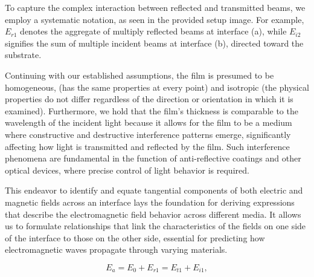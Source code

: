 To capture the complex interaction between reflected and transmitted beams, we employ a systematic notation, as seen in the provided setup image. For example, $E_{r1}$ denotes the aggregate of multiply reflected beams at interface (a), while $E_{i2}$ signifies the sum of multiple incident beams at interface (b), directed toward the substrate. %

Continuing with our established assumptions, the film is presumed to be homogeneous, (has the same properties at every point) and isotropic (the physical properties do not differ regardless of the direction or orientation in which it is examined). Furthermore, we hold that the film's thickness is comparable to the wavelength of the incident light because it allows for the film to be a medium where constructive and destructive interference patterns emerge, significantly affecting how light is transmitted and reflected by the film. Such interference phenomena are fundamental in the function of anti-reflective coatings and other optical devices, where precise control of light behavior is required. %


This endeavor to identify and equate tangential components of both electric and magnetic fields across an interface lays the foundation for deriving expressions that describe the electromagnetic field behavior across different media. It allows us to formulate relationships that link the characteristics of the fields on one side of the interface to those on the other side, essential for predicting how electromagnetic waves propagate through varying materials.

    \begin{equation} \label{E_a - Multilayer films electric field boundary equations}
    E_a = E_0 + E_{r1} = E_{t1} + E_{i1},
    \end{equation}
    
